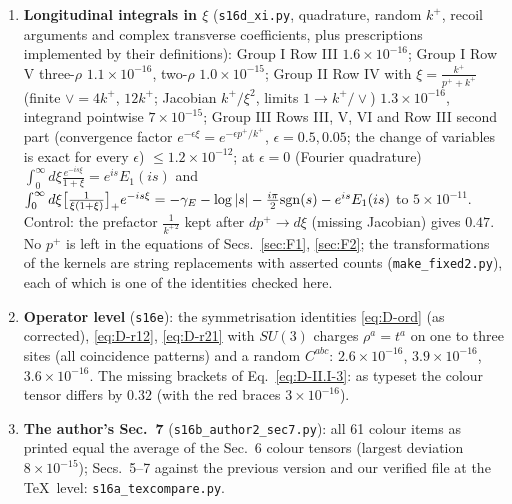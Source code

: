 \documentclass[9pt]{article}
\numberwithin{equation}{section}
\begin{document}
\begin{enumerate}
\item \textbf{Longitudinal integrals in $\xi$} (\texttt{s16d\_xi.py}, quadrature, random $k^{+}$, recoil arguments and complex transverse coefficients, plus prescriptions implemented by their definitions): Group I Row III $1.6\times10^{-16}$; Group I Row V three-$\rho$ $1.1\times10^{-16}$, two-$\rho$ $1.0\times10^{-15}$; Group II Row IV with $\xi=\frac{k^{+}}{p^{+}+k^{+}}$ (finite $\vee=4k^{+}$, $12k^{+}$; Jacobian $k^{+}/\xi^{2}$, limits $1\to k^{+}/\vee$) $1.3\times10^{-16}$, integrand pointwise $7\times10^{-15}$; Group III Rows III, V, VI and Row III second part (convergence factor $e^{-\epsilon\xi}=e^{-\epsilon p^{+}/k^{+}}$, $\epsilon=0.5,0.05$; the change of variables is exact for every $\epsilon$) $\le1.2\times10^{-12}$; at $\epsilon=0$ (Fourier quadrature) $\int_{0}^{\infty}d\xi\frac{e^{-is\xi}}{1+\xi}=e^{is}E_{1}(is)$ and $\int_{0}^{\infty}d\xi\big[\frac{1}{\xi(1+\xi)}\big]_{+}e^{-is\xi}=-\gamma_{E}-\log|s|-\frac{i\pi}{2}{\rm sgn}(s)-e^{is}E_{1}(is)$ to $5\times10^{-11}$. Control: the prefactor $\frac{1}{k^{+\,2}}$ kept after $dp^{+}\to d\xi$ (missing Jacobian) gives $0.47$. No $p^{+}$ is left in the equations of Secs.~\ref{sec:F1}, \ref{sec:F2}; the transformations of the kernels are string replacements with asserted counts (\texttt{make\_fixed2.py}), each of which is one of the identities checked here.
\item \textbf{Operator level} (\texttt{s16e}): the symmetrisation identities \eqref{eq:D-ord} (as corrected), \eqref{eq:D-r12}, \eqref{eq:D-r21} with $SU(3)$ charges $\rho^{a}=t^{a}$ on one to three sites (all coincidence patterns) and a random $C^{abc}$: $2.6\times10^{-16}$, $3.9\times10^{-16}$, $3.6\times10^{-16}$. The missing brackets of Eq.~\eqref{eq:D-II.I-3}: as typeset the colour tensor differs by $0.32$ (with the red braces $3\times10^{-16}$).
\item \textbf{The author's Sec.~7} (\texttt{s16b\_author2\_sec7.py}): all 61 colour items as printed equal the average of the Sec.~6 colour tensors (largest deviation $8\times10^{-15}$); Secs.~5--7 against the previous version and our verified file at the \TeX\ level: \texttt{s16a\_texcompare.py}.
\end{enumerate}
\end{document}
